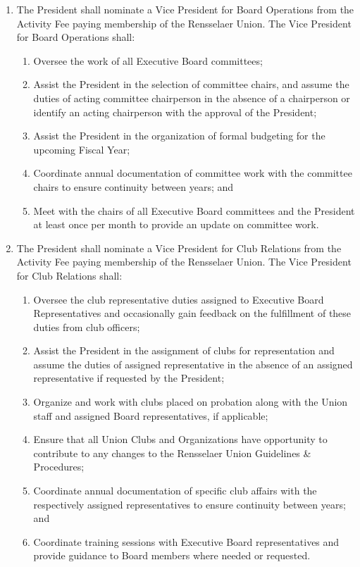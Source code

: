 \begin{enumerate}
\begin{enumerate}
  \end{enumerate}
\item The President shall nominate a Vice President for Board Operations from the Activity Fee paying membership of the Rensselaer Union. The Vice President for Board Operations shall:
  \begin{enumerate}
  \item Oversee the work of all Executive Board committees;
  \item Assist the President in the selection of committee chairs, and assume the duties of acting committee chairperson in the absence of a chairperson or identify an acting chairperson with the approval of the President;
  \item Assist the President in the organization of formal budgeting for the upcoming Fiscal Year;
  \item Coordinate annual documentation of committee work with the committee chairs to ensure continuity between years; and
  \item Meet with the chairs of all Executive Board committees and the President at least once per month to provide an update on committee work.
  \end{enumerate}
\item The President shall nominate a Vice President for Club Relations from the Activity Fee paying membership of the Rensselaer Union. The Vice President for Club Relations shall:
  \begin{enumerate}
  \item Oversee the club representative duties assigned to Executive Board Representatives and occasionally gain feedback on the fulfillment of these duties from club officers;
  \item Assist the President in the assignment of clubs for representation and assume the duties of assigned representative in the absence of an assigned representative if requested by the President;
  \item Organize and work with clubs placed on probation along with the Union staff and assigned Board representatives, if applicable;
  \item Ensure that all Union Clubs and Organizations have opportunity to contribute to any changes to the Rensselaer Union Guidelines \& Procedures;
  \item Coordinate annual documentation of specific club affairs with the respectively assigned representatives to ensure continuity between years; and
  \item Coordinate training sessions with Executive Board representatives and provide guidance to Board members where needed or requested.

\end{enumerate}
\end{enumerate}
